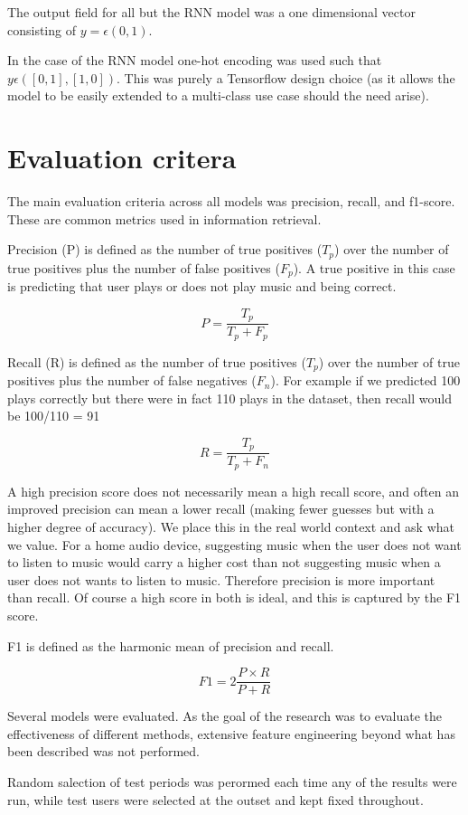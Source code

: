 The output field for all but the RNN model was a one dimensional vector consisting of $y = \epsilon (0,1)$.

In the case of the RNN model one-hot encoding was used such that $y \epsilon ([0,1],[1,0])$. This was purely a Tensorflow design choice (as it allows the model to be easily extended to a multi-class use case should the need arise).

\section{Evaluation critera}

The main evaluation criteria across all models was precision, recall, and f1-score. These are common metrics used in information retrieval. 

Precision (P) is defined as the number of true positives  ($T_p$) over the number of true positives plus the number of false positives ($F_p$). A true positive in this case is predicting that user plays or does not play music and being correct.

$$P = \frac{T_p}{T_p+F_p}$$

Recall (R) is defined as the number of true positives ($T_p$) over the number of true positives plus the number of false negatives ($F_n$). For example if we predicted 100 plays correctly but there were in fact 110 plays in the dataset, then recall would be 100/110 = 91%

$$R = \frac{T_p}{T_p + F_n}$$

A high precision score does not necessarily mean a high recall score, and often an improved precision can mean a lower recall (making fewer guesses but with a higher degree of accuracy). We place this in the real world context and ask what we value. For a home audio device, suggesting music when the user does not want to listen to music would carry a higher cost than not suggesting music when a user does not wants to listen to music. Therefore precision is more important than recall. Of course a high score in both is ideal, and this is captured by the F1 score.

F1 is defined as the harmonic mean of precision and recall.

$$F1 = 2\frac{P \times R}{P+R}$$

Several models were evaluated. As the goal of the research was to evaluate the effectiveness of different methods, extensive feature engineering beyond what has been described was not performed. 

Random salection of test periods was perormed each time any of the results were run, while test users were selected at the outset and kept fixed throughout.
 
